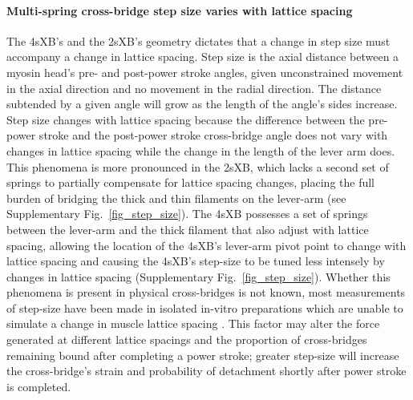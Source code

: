 \documentclass[]{article}
\begin{document}
\paragraph{Multi-spring cross-bridge step size varies with lattice spacing} %
The 4sXB's and the 2sXB's geometry dictates that a change in step size must accompany a change in lattice spacing. 
Step size is the axial distance between a myosin head's pre- and post-power stroke angles, given unconstrained movement in the axial direction and no movement in the radial direction. 
The distance subtended by a given angle will grow as the length of the angle's sides increase. 
Step size changes with lattice spacing because the difference between the pre-power stroke and the post-power stroke cross-bridge angle does not vary with changes in lattice spacing while the change in the length of the lever arm does. 
This phenomena is more pronounced in the 2sXB, which lacks a second set of springs to partially compensate for lattice spacing changes, placing the full burden of bridging the thick and thin filaments on the lever-arm (see Supplementary Fig.~\ref{fig_step_size}). 
The 4sXB possesses a set of springs between the lever-arm and the thick filament that also adjust with lattice spacing, allowing the location of the 4sXB's lever-arm pivot point to change with lattice spacing and causing the 4sXB's step-size to be tuned less intensely by changes in lattice spacing (Supplementary Fig.~\ref{fig_step_size}).  
Whether this phenomena is present in physical cross-bridges is not known, most measurements of step-size have been made in isolated in-vitro preparations which are unable to simulate a change in muscle lattice spacing \citep{HowardBook, Peterman2004}.  
This factor may alter the force generated at different lattice spacings and the proportion of cross-bridges remaining bound after completing a power stroke; greater step-size will increase the cross-bridge's strain and probability of detachment shortly after power stroke is completed. 
\end{document}
